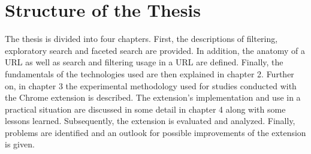 \section{Structure of the Thesis}
The thesis is divided into four chapters. First, the descriptions of filtering, exploratory search and faceted search are provided. In addition, the anatomy of a URL as well as search and filtering usage in a URL are defined. Finally, the fundamentals of the technologies used are then explained in chapter 2. Further on, in chapter 3 the experimental methodology used for studies conducted with the Chrome extension is described. The extension's implementation and use in a practical situation are discussed in some detail in chapter 4 along with some lessons learned. Subsequently, the extension is evaluated and analyzed. Finally, problems are identified and an outlook for possible improvements of the extension is given.
